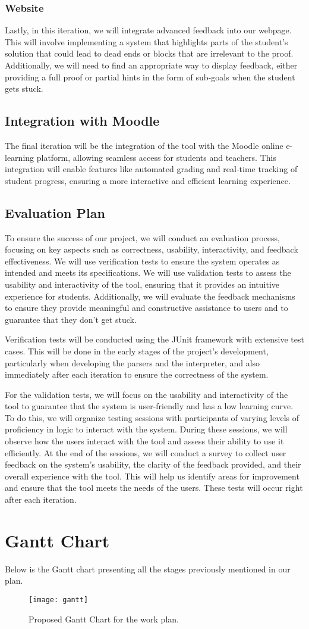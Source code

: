 \subsubsection{Website}
Lastly, in this iteration, we will integrate advanced feedback into our webpage. This will involve implementing a system that highlights parts of the student's solution that could lead to dead ends or blocks that are irrelevant to the proof. Additionally, we will need to find an appropriate way to display feedback, either providing a full proof or partial hints in the form of sub-goals when the student gets stuck.

\subsection{Integration with Moodle}
The final iteration will be the integration of the tool with the Moodle online e-learning platform, allowing seamless access for students and teachers. This integration will enable features like automated grading and real-time tracking of student progress, ensuring a more interactive and efficient learning experience.

\subsection{Evaluation Plan}
To ensure the success of our project, we will conduct an evaluation process, focusing on key aspects such as correctness, usability, interactivity, and feedback effectiveness. We will use verification tests to ensure the system operates as intended and meets its specifications. We will use validation tests to assess the usability and interactivity of the tool, ensuring that it provides an intuitive experience for students. Additionally, we will evaluate the feedback mechanisms to ensure they provide meaningful and constructive assistance to users and to guarantee that they don't get stuck.

Verification tests will be conducted using the JUnit framework with extensive test cases. This will be done in the early stages of the project’s development, particularly when developing the parsers and the interpreter, and also immediately after each iteration to ensure the correctness of the system.

For the validation tests, we will focus on the usability and interactivity of the tool to guarantee that the system is user-friendly and has a low learning curve. To do this, we will organize testing sessions with participants of varying levels of proficiency in logic to interact with the system. During these sessions, we will observe how the users interact with the tool and assess their ability to use it efficiently. At the end of the sessions, we will conduct a survey to collect user feedback on the system’s usability, the clarity of the feedback provided, and their overall experience with the tool. This will help us identify areas for improvement and ensure that the tool meets the needs of the users. These tests will occur right after each iteration.

\section{Gantt Chart}
Below is the Gantt chart presenting all the stages previously mentioned in our plan.
\begin{figure}[htbp]
    \centering
    \texttt{[image: gantt]}
    \caption{Proposed Gantt Chart for the work plan.}
    \label{img:gantt}
\end{figure}